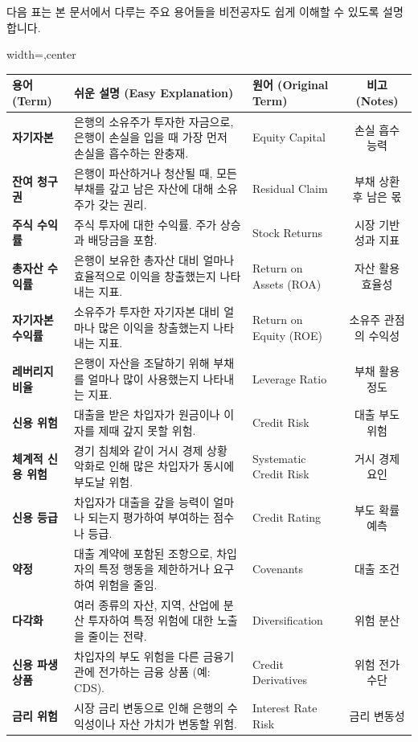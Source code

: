 \documentclass[11pt,a4paper]{article}
\theoremstyle{definition}
\begin{document}
다음 표는 본 문서에서 다루는 주요 용어들을 비전공자도 쉽게 이해할 수 있도록 설명합니다.

\begin{adjustbox}{width=\textwidth,center}
\begin{tabular}{lllc}
\toprule
\textbf{용어 (Term)} & \textbf{쉬운 설명 (Easy Explanation)} & \textbf{원어 (Original Term)} & \textbf{비고 (Notes)} \\
\midrule
\textbf{자기자본} & 은행의 소유주가 투자한 자금으로, 은행이 손실을 입을 때 가장 먼저 손실을 흡수하는 완충재. & Equity Capital & 손실 흡수 능력 \\
\textbf{잔여 청구권} & 은행이 파산하거나 청산될 때, 모든 부채를 갚고 남은 자산에 대해 소유주가 갖는 권리. & Residual Claim & 부채 상환 후 남은 몫 \\
\textbf{주식 수익률} & 주식 투자에 대한 수익률. 주가 상승과 배당금을 포함. & Stock Returns & 시장 기반 성과 지표 \\
\textbf{총자산 수익률} & 은행이 보유한 총자산 대비 얼마나 효율적으로 이익을 창출했는지 나타내는 지표. & Return on Assets (ROA) & 자산 활용 효율성 \\
\textbf{자기자본 수익률} & 소유주가 투자한 자기자본 대비 얼마나 많은 이익을 창출했는지 나타내는 지표. & Return on Equity (ROE) & 소유주 관점의 수익성 \\
\textbf{레버리지 비율} & 은행이 자산을 조달하기 위해 부채를 얼마나 많이 사용했는지 나타내는 지표. & Leverage Ratio & 부채 활용 정도 \\
\textbf{신용 위험} & 대출을 받은 차입자가 원금이나 이자를 제때 갚지 못할 위험. & Credit Risk & 대출 부도 위험 \\
\textbf{체계적 신용 위험} & 경기 침체와 같이 거시 경제 상황 악화로 인해 많은 차입자가 동시에 부도날 위험. & Systematic Credit Risk & 거시 경제 요인 \\
\textbf{신용 등급} & 차입자가 대출을 갚을 능력이 얼마나 되는지 평가하여 부여하는 점수나 등급. & Credit Rating & 부도 확률 예측 \\
\textbf{약정} & 대출 계약에 포함된 조항으로, 차입자의 특정 행동을 제한하거나 요구하여 위험을 줄임. & Covenants & 대출 조건 \\
\textbf{다각화} & 여러 종류의 자산, 지역, 산업에 분산 투자하여 특정 위험에 대한 노출을 줄이는 전략. & Diversification & 위험 분산 \\
\textbf{신용 파생상품} & 차입자의 부도 위험을 다른 금융기관에 전가하는 금융 상품 (예: CDS). & Credit Derivatives & 위험 전가 수단 \\
\textbf{금리 위험} & 시장 금리 변동으로 인해 은행의 수익성이나 자산 가치가 변동할 위험. & Interest Rate Risk & 금리 변동성 \\

\end{tabular}
\end{adjustbox}
\end{document}
